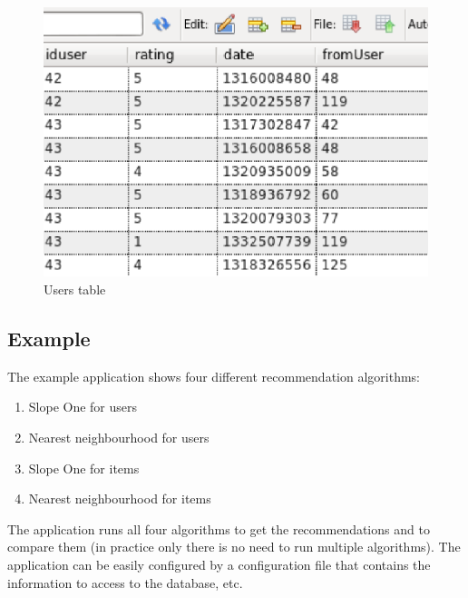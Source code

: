 \documentclass[a4paper,10pt]{article}
\begin{document}
\begin{center}
\begin{figure}%
\begin{centering}
\includegraphics[scale=0.6]{users}
\par\end{centering}
\caption{Users table\label{fig:Users-table}}
\end{figure}
\par\end{center}


\subsection{Example}

The example application shows four different recommendation algorithms:

\begin{enumerate}
    \item Slope One for users
    \item Nearest neighbourhood for users
    \item Slope One for items
    \item Nearest neighbourhood for items
\end{enumerate}

The application runs all four algorithms to get the recommendations and to compare them (in practice only there is no need to run multiple algorithms). The application can be easily configured by a configuration file that contains the information to access to the database, etc.
\end{document}
